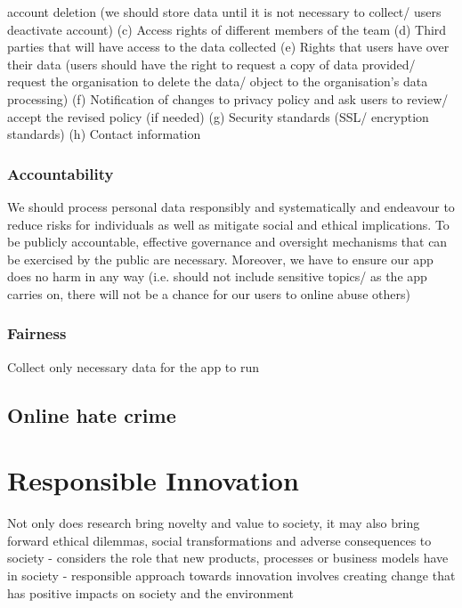 \begin{enumerate}
account deletion (we should store data until it is not necessary to collect/ users deactivate account)
(c)	Access rights of different members of the team
(d)	Third parties that will have access to the data collected
(e)	Rights that users have over their data (users should have the right to request a copy of data provided/ request the organisation to delete the data/ object to the organisation’s data processing)
(f)	Notification of changes to privacy policy and ask users to review/ accept the revised policy (if needed)
(g)	Security standards (SSL/ encryption standards)
(h)	Contact information
\end{enumerate}
\subsubsection{Accountability}
We should process personal data responsibly and systematically and endeavour to reduce risks for individuals as 
well as mitigate social and ethical implications.\cite{principles} To be publicly accountable, 
effective governance and oversight mechanisms that can be exercised by the public are
necessary. Moreover, we have to ensure our app does no harm in any way (i.e. should not include sensitive topics/ as the app carries on, there will not be a chance for our users to online abuse others)


\subsubsection{Fairness}
 Collect only necessary data for the app to run




\subsection{Online hate crime}
\section{Responsible Innovation}
Not only does research bring novelty and value to society, it may also bring forward ethical dilemmas, social transformations and adverse consequences to society
-	considers the role that new products, processes or business models have in society 
-	responsible approach towards innovation involves creating change that has positive impacts on society and the environment

